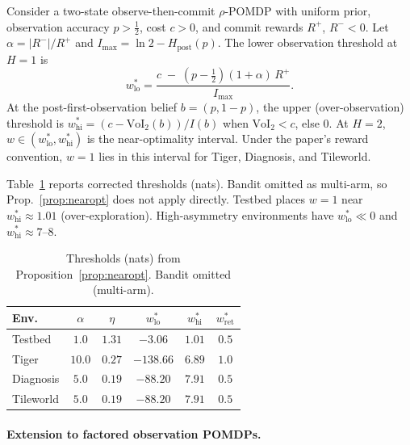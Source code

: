 \documentclass[runningheads]{llncs}
\begin{document}
\begin{proposition}
\label{prop:nearopt}
Consider a two-state observe-then-commit $\rho$-POMDP with uniform prior, observation accuracy $p > \tfrac{1}{2}$, cost $c > 0$, and commit rewards $R^+$, $R^- < 0$. Let $\alpha = |R^-|/R^+$ and $I_{\max} = \ln 2 - H_{\text{post}}(p)$. The lower observation threshold at $H{=}1$ is
\begin{equation*}
    w^*_{\mathrm{lo}} = \frac{c \;-\; \left(p - \tfrac{1}{2}\right)(1 + \alpha)\,R^+}{\,I_{\max}\,}.
\end{equation*}
At the post-first-observation belief $b{=}(p,1{-}p)$, the upper (over-observation) threshold is $w^*_{\mathrm{hi}} = (c - \mathrm{VoI}_2(b))/I(b)$ when $\mathrm{VoI}_2 < c$, else $0$. At $H{=}2$, $w \in (w^*_{\mathrm{lo}}, w^*_{\mathrm{hi}})$ is the near-optimality interval. Under the paper's reward convention, $w{=}1$ lies in this interval for Tiger, Diagnosis, and Tileworld.
\end{proposition}

Table~\ref{tab:alpha_eta} reports corrected thresholds (nats). Bandit omitted as multi-arm, so Prop.~\ref{prop:nearopt} does not apply directly. Testbed places $w{=}1$ near $w^*_{\mathrm{hi}} \approx 1.01$ (over-exploration). High-asymmetry environments have $w^*_{\mathrm{lo}} \ll 0$ and $w^*_{\mathrm{hi}} \approx 7$--$8$.

\begin{table}[ht]
\centering
\caption{Thresholds (nats) from Proposition~\ref{prop:nearopt}. Bandit omitted (multi-arm).}
\label{tab:alpha_eta}
\begin{small}
\begin{tabular}{lccccc}
\toprule
Env. & $\alpha$ & $\eta$ & $w^*_{\mathrm{lo}}$ & $w^*_{\mathrm{hi}}$ & $w^*_{\mathrm{ret}}$ \\
\midrule
Testbed & $1.0$ & $1.31$ & $-3.06$ & $1.01$ & $0.5$ \\
Tiger & $10.0$ & $0.27$ & $-138.66$ & $6.89$ & $1.0$ \\
Diagnosis & $5.0$ & $0.19$ & $-88.20$ & $7.91$ & $0.5$ \\
Tileworld & $5.0$ & $0.19$ & $-88.20$ & $7.91$ & $0.5$ \\
\bottomrule
\end{tabular}
\end{small}
\end{table}

\paragraph{Extension to factored observation POMDPs.}
\label{par:frontier}
\end{document}
